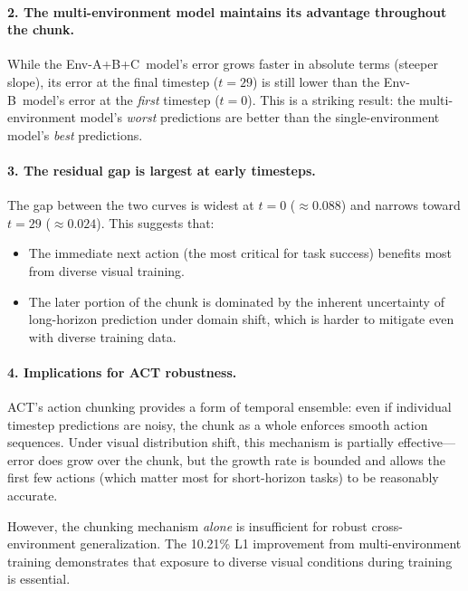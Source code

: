\documentclass[twoside,twocolumn,10pt]{article}
\newcommand{\envB}{B}
\newcommand{\envABC}{A+B+C}
\begin{document}
\paragraph{2. The multi-environment model maintains its advantage throughout the
chunk.}
While the Env-\envABC~model's error grows faster in absolute terms (steeper
slope), its error at the final timestep ($t=29$) is still lower than the
Env-\envB~model's error at the \emph{first} timestep ($t=0$).  This is a
striking result: the multi-environment model's \emph{worst} predictions are
better than the single-environment model's \emph{best} predictions.

\paragraph{3. The residual gap is largest at early timesteps.}
The gap between the two curves is widest at $t=0$ ($\approx 0.088$) and narrows
toward $t=29$ ($\approx 0.024$).  This suggests that:
\begin{itemize}[nosep]
  \item The immediate next action (the most critical for task success) benefits
        most from diverse visual training.
  \item The later portion of the chunk is dominated by the inherent uncertainty
        of long-horizon prediction under domain shift, which is harder to
        mitigate even with diverse training data.
\end{itemize}

\paragraph{4. Implications for ACT robustness.}
ACT's action chunking provides a form of temporal ensemble: even if individual
timestep predictions are noisy, the chunk as a whole enforces smooth action
sequences.  Under visual distribution shift, this mechanism is partially
effective---error does grow over the chunk, but the growth rate is bounded and
allows the first few actions (which matter most for short-horizon tasks) to be
reasonably accurate.

However, the chunking mechanism \emph{alone} is insufficient for robust
cross-environment generalization.  The 10.21\% L1 improvement from
multi-environment training demonstrates that exposure to diverse visual
conditions during training is essential.

\end{document}
